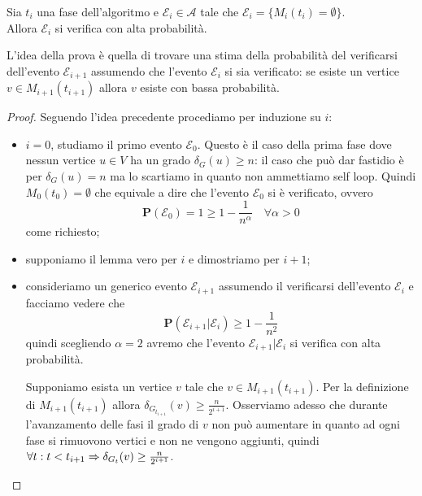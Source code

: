 \documentclass{article}
\begin{document}
\begin{lemma}
    \label{lemma:epsilon-i}
    Sia $t_i$ una fase dell'algoritmo e $\mathcal{E}_i \in \mathcal{A}$ 
    tale che $\mathcal{E}_i = \lbrace M_i(t_i) = \emptyset\rbrace$. \\
    Allora $\mathcal{E}_i$ si verifica con alta probabilit\`a.
\end{lemma}

    L'idea della prova \`e quella di trovare una stima della probabilit\`a 
    del verificarsi dell'evento $\mathcal{E}_{i+1}$ assumendo che l'evento 
    $\mathcal{E}_{i}$ si sia verificato: se esiste un vertice 
    $v \in M_{i+1}(t_{i+1})$ allora $v$ esiste con bassa
    probabilit\`a.

\begin{proof}
Seguendo l'idea precedente procediamo per induzione su $i$:
\begin{itemize}
    \item $i = 0$, studiamo il primo evento $\mathcal{E}_0$. Questo 
    \`e il caso della prima fase dove nessun vertice $u \in V$ ha un grado 
    $\delta_G(u) \geq n$: il caso che pu\`o dar fastidio \`e per
    $\delta_G(u) = n$ ma lo scartiamo in quanto non ammettiamo self loop. 
    Quindi $M_0(t_0) = \emptyset$ che equivale a dire
    che l'evento $\mathcal{E}_0$ si \`e verificato, ovvero 
    \begin{displaymath}
        \mathbf{P} (\mathcal{E}_0) = 1 \geq 1 - \frac{1}{n^\alpha} \quad
        \forall \alpha > 0
    \end{displaymath}    
     come richiesto;

    \item supponiamo il lemma vero per $i$ e dimostriamo per $i+1$;

    \item consideriamo un generico evento $\mathcal{E}_{i+1}$ assumendo il
    verificarsi dell'evento $\mathcal{E}_{i}$ e facciamo vedere che
    \begin{displaymath}
        \mathbf{P}(\mathcal{E}_{i+1} | \mathcal{E}_{i}) \geq 1 - \frac{1}{n^2}
    \end{displaymath}
    quindi scegliendo $\alpha = 2$ avremo che l'evento 
    $\mathcal{E}_{i+1} | \mathcal{E}_{i}$ si verifica con alta probabilit\`a.

    Supponiamo esista un vertice $v$ tale che $v \in M_{i+1}(t_{i+1})$. Per
    la definizione di $M_{i+1}(t_{i+1})$ allora $\delta_{G_{t_{i+1}}}(v) 
    \geq \frac{n}{2^{i+1}}$. Osserviamo adesso che durante l'avanzamento delle
    fasi il grado di $v$ non pu\`o aumentare in quanto ad ogni fase si 
    rimuovono vertici e non ne vengono aggiunti, quindi $\forall t: 
    t < t_{i+1} \Rightarrow \delta_{G_{t}}(v) \geq \frac{n}{2^{i+1}}$.


\end{itemize}
\end{proof}
\end{document}
